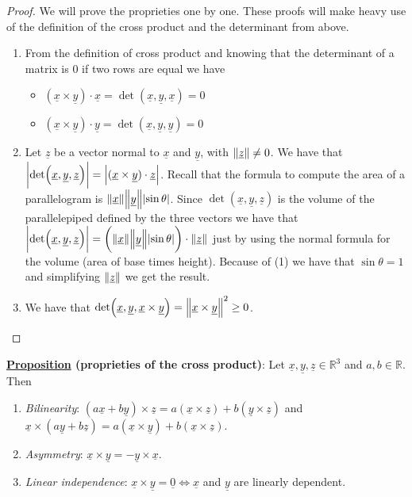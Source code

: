 \documentclass[10pt]{extarticle}
\newcommand{\R}{\mathbb{R}}
\begin{document}
\begin{proof}
    We will prove the proprieties one by one.
    These proofs will make heavy use of the definition of the cross product and the determinant from above.
    \begin{enumerate}
        \item From the definition of cross product and knowing that the determinant of a matrix is 0 if two rows are equal we have
              \begin{itemize}
                  \item $(\underline{x} \times \underline{y}) \cdot \underline{x} = \det (\underline{x}, \underline{y}, \underline{x}) = 0$
                  \item $(\underline{x} \times \underline{y}) \cdot \underline{y} = \det (\underline{x}, \underline{y}, \underline{y}) = 0$
              \end{itemize}
        \item Let $\underline{z}$ be a vector normal to $\underline{x}$ and $\underline{y}$, with $\norm{\underline{z}} \ne 0$.
              We have that $\abs{\det (\underline{x}, \underline{y}, \underline{z})} = \abs{(\underline{x} \times \underline{y}) \cdot \underline{z}}$.
              Recall that the formula to compute the area of a parallelogram is $\norm{\underline{x}} \norm{\underline{y}} \abs{\sin \theta}$.
              Since $\det (\underline{x}, \underline{y}, \underline{z})$ is the volume of the parallelepiped defined by the three vectors we have that
              $\abs{\det (\underline{x}, \underline{y}, \underline{z})} = \left(\norm{\underline{x}} \norm{\underline{y}} \abs{\sin \theta}\right) \cdot \norm{\underline{z}}$ just by using the normal formula for the volume (area of base times height).
              Because of (1) we have that $\sin \theta = 1$ and simplifying $\norm{\underline{z}}$ we get the result.
        \item We have that $\det (\underline{x}, \underline{y}, \underline{x} \times \underline{y}) = \norm{\underline{x} \times \underline{y}}^2 \geq 0$.
    \end{enumerate}
\end{proof}

\textbf{\underline{Proposition} (proprieties of the cross product)}:
Let $\underline{x}, \underline{y}, \underline{z} \in \R^3$ and $a, b \in \R$. Then

\begin{enumerate}
    \item \textit{Bilinearity}: $(a \underline{x} + b \underline{y}) \times \underline{z} = a (\underline{x} \times \underline{z}) + b (\underline{y} \times \underline{z})$ and $\underline{x} \times (a \underline{y} + b \underline{z}) = a (\underline{x} \times \underline{y}) + b (\underline{x} \times \underline{z})$.
    \item \textit{Asymmetry}: $\underline{x} \times \underline{y} = - \underline{y} \times \underline{x}$.
    \item \textit{Linear independence}: $\underline{x} \times \underline{y} = \underline{0} \iff \underline{x}$ and $\underline{y}$ are linearly dependent.
\end{enumerate}
\end{document}
